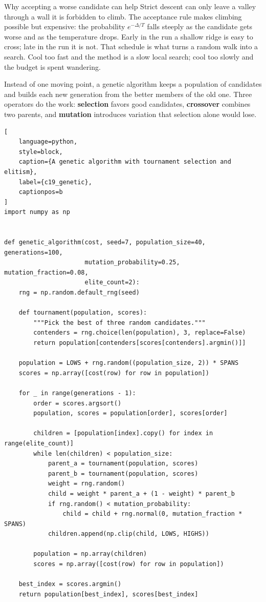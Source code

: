 \begin{ExplainBox}{Why accepting a worse candidate can help}
Strict descent can only leave a valley through a wall it is forbidden to climb.
The acceptance rule makes climbing possible but expensive: the probability
$e^{-\Delta/T}$ falls steeply as the candidate gets worse and as the temperature
drops. Early in the run a shallow ridge is easy to cross; late in the run it is
not. That schedule is what turns a random walk into a search. Cool too fast and
the method is a slow local search; cool too slowly and the budget is spent
wandering.
\end{ExplainBox}


Instead of one moving point, a genetic algorithm keeps a population of
candidates and builds each new generation from the better members of the old
one. Three operators do the work: \textbf{selection} favors good candidates,
\textbf{crossover} combines two parents, and \textbf{mutation} introduces
variation that selection alone would lose.

\begin{lstlisting}[
    language=python,
    style=block,
    caption={A genetic algorithm with tournament selection and elitism},
    label={c19_genetic},
    captionpos=b
]
import numpy as np


def genetic_algorithm(cost, seed=7, population_size=40, generations=100,
                      mutation_probability=0.25, mutation_fraction=0.08,
                      elite_count=2):
    rng = np.random.default_rng(seed)

    def tournament(population, scores):
        """Pick the best of three random candidates."""
        contenders = rng.choice(len(population), 3, replace=False)
        return population[contenders[scores[contenders].argmin()]]

    population = LOWS + rng.random((population_size, 2)) * SPANS
    scores = np.array([cost(row) for row in population])

    for _ in range(generations - 1):
        order = scores.argsort()
        population, scores = population[order], scores[order]

        children = [population[index].copy() for index in range(elite_count)]
        while len(children) < population_size:
            parent_a = tournament(population, scores)
            parent_b = tournament(population, scores)
            weight = rng.random()
            child = weight * parent_a + (1 - weight) * parent_b
            if rng.random() < mutation_probability:
                child = child + rng.normal(0, mutation_fraction * SPANS)
            children.append(np.clip(child, LOWS, HIGHS))

        population = np.array(children)
        scores = np.array([cost(row) for row in population])

    best_index = scores.argmin()
    return population[best_index], scores[best_index]
\end{lstlisting}

